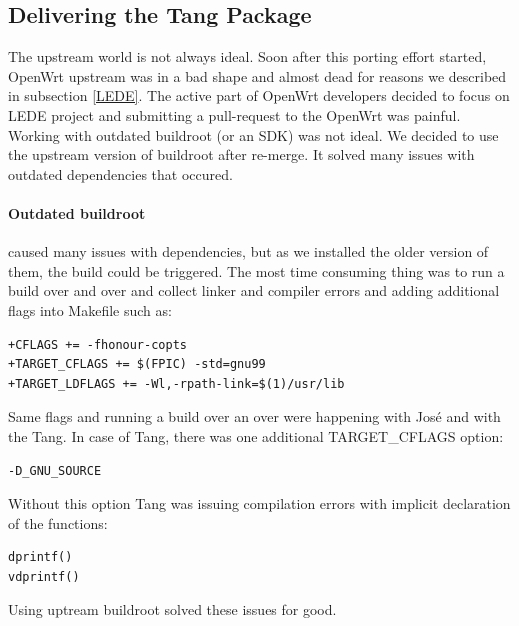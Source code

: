 \subsection{Delivering the Tang Package}\label{porting_problems}

The upstream world is not always ideal.
Soon after this porting effort started, OpenWrt upstream was in a bad shape and almost dead for reasons we described in subsection \ref{LEDE}.
The active part of OpenWrt developers decided to focus on LEDE project and submitting a pull-request to the OpenWrt was painful.
Working with outdated buildroot (or an SDK) was not ideal.
We decided to use the upstream version of buildroot after re-merge.
It solved many issues with outdated dependencies that occured.

\paragraph{Outdated buildroot} caused many issues with dependencies, but as we installed the older version of them, the build could be triggered.
The most time consuming thing was to run a build over and over and collect linker and compiler errors and adding additional flags into Makefile such as:
\begin{lstlisting}[columns=fixed,basicstyle=\ttfamily\footnotesize,tabsize=4,backgroundcolor=\color{yellow!10}]
+CFLAGS += -fhonour-copts
+TARGET_CFLAGS += $(FPIC) -std=gnu99
+TARGET_LDFLAGS += -Wl,-rpath-link=$(1)/usr/lib
\end{lstlisting}
Same flags and running a build over an over were happening with José and with the Tang.
In case of Tang, there was one additional TARGET\_CFLAGS option:
\begin{lstlisting}[columns=fixed,basicstyle=\ttfamily\footnotesize,tabsize=4,backgroundcolor=\color{yellow!10}]
-D_GNU_SOURCE
\end{lstlisting}
Without this option Tang was issuing compilation errors with implicit declaration of the functions:
\begin{lstlisting}[columns=fixed,basicstyle=\ttfamily\footnotesize,tabsize=4,backgroundcolor=\color{yellow!10}]
dprintf()
vdprintf()
\end{lstlisting}
Using uptream buildroot solved these issues for good.

